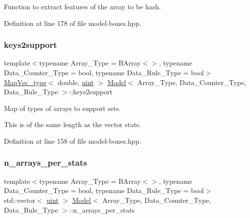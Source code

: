 Function to extract features of the array to be hash. 



Definition at line 178 of file model-\/bones.\+hpp.

\mbox{\label{class_model_a2a81190ac618b04479686411d02b3c5f}} 
\subsubsection{\texorpdfstring{keys2support}{keys2support}}
{\footnotesize\ttfamily template$<$typename Array\+\_\+\+Type = B\+Array$<$$>$, typename Data\+\_\+\+Counter\+\_\+\+Type = bool, typename Data\+\_\+\+Rule\+\_\+\+Type = bool$>$ \\
\hyperlink{typedefs_8hpp_a02ed8dec96bc528c8bc3d8cb3c4674a5}{Map\+Vec\+\_\+type}$<$ double, \hyperlink{typedefs_8hpp_a91ad9478d81a7aaf2593e8d9c3d06a14}{uint} $>$ \hyperlink{class_model}{Model}$<$ Array\+\_\+\+Type, Data\+\_\+\+Counter\+\_\+\+Type, Data\+\_\+\+Rule\+\_\+\+Type $>$\+::keys2support}



Map of types of arrays to support sets. 

This is of the same length as the vector {\ttfamily stats}. 

Definition at line 158 of file model-\/bones.\+hpp.

\mbox{\label{class_model_a410caeff58afe605520c878a0689abf5}} 
\subsubsection{\texorpdfstring{n\+\_\+arrays\+\_\+per\+\_\+stats}{n\_arrays\_per\_stats}}
{\footnotesize\ttfamily template$<$typename Array\+\_\+\+Type = B\+Array$<$$>$, typename Data\+\_\+\+Counter\+\_\+\+Type = bool, typename Data\+\_\+\+Rule\+\_\+\+Type = bool$>$ \\
std\+::vector$<$ \hyperlink{typedefs_8hpp_a91ad9478d81a7aaf2593e8d9c3d06a14}{uint} $>$ \hyperlink{class_model}{Model}$<$ Array\+\_\+\+Type, Data\+\_\+\+Counter\+\_\+\+Type, Data\+\_\+\+Rule\+\_\+\+Type $>$\+::n\+\_\+arrays\+\_\+per\+\_\+stats}



